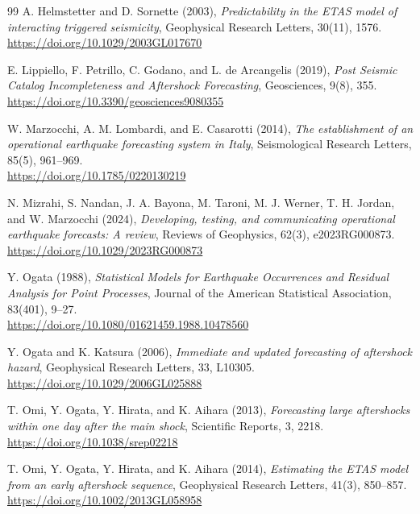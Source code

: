 \documentclass[12pt,letterpaper]{article}
\begin{document}
\begin{thebibliography}{99}
A. Helmstetter and D. Sornette (2003),
\emph{Predictability in the ETAS model of interacting triggered seismicity},
Geophysical Research Letters, 30(11), 1576.\\
\url{https://doi.org/10.1029/2003GL017670}

E. Lippiello, F. Petrillo, C. Godano, and L. de Arcangelis (2019),
\emph{Post Seismic Catalog Incompleteness and Aftershock Forecasting},
Geosciences, 9(8), 355.\\
\url{https://doi.org/10.3390/geosciences9080355}

W. Marzocchi, A. M. Lombardi, and E. Casarotti (2014),
\emph{The establishment of an operational earthquake forecasting system in
Italy},
Seismological Research Letters, 85(5), 961--969.\\
\url{https://doi.org/10.1785/0220130219}

N. Mizrahi, S. Nandan, J. A. Bayona, M. Taroni, M. J. Werner,
T. H. Jordan, and W. Marzocchi (2024),
\emph{Developing, testing, and communicating operational earthquake forecasts:
A review},
Reviews of Geophysics, 62(3), e2023RG000873.\\
\url{https://doi.org/10.1029/2023RG000873}

Y. Ogata (1988),
\emph{Statistical Models for Earthquake Occurrences and Residual Analysis for
Point Processes},
Journal of the American Statistical Association, 83(401), 9--27.\\
\url{https://doi.org/10.1080/01621459.1988.10478560}

Y. Ogata and K. Katsura (2006),
\emph{Immediate and updated forecasting of aftershock hazard},
Geophysical Research Letters, 33, L10305.\\
\url{https://doi.org/10.1029/2006GL025888}

T. Omi, Y. Ogata, Y. Hirata, and K. Aihara (2013),
\emph{Forecasting large aftershocks within one day after the main shock},
Scientific Reports, 3, 2218.\\
\url{https://doi.org/10.1038/srep02218}

T. Omi, Y. Ogata, Y. Hirata, and K. Aihara (2014),
\emph{Estimating the ETAS model from an early aftershock sequence},
Geophysical Research Letters, 41(3), 850--857.\\
\url{https://doi.org/10.1002/2013GL058958}


\end{thebibliography}
\end{document}
